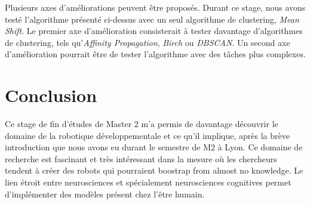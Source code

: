 \documentclass{llncs}
\begin{document}
Plusieurs axes d'améliorations peuvent être proposés. Durant ce stage, nous avons testé l'algorithme présenté ci-dessus avec un seul algorithme de clustering, \textit{Mean Shift}. Le premier axe d'amélioration consisterait à tester davantage d'algorithmes de clustering, tels qu'\textit{Affinity Propagation}, \textit{Birch} ou \textit{DBSCAN}. Un second axe d'amélioration pourrait être de tester l'algorithme avec des tâches plus complexes.

\section{Conclusion}

Ce stage de fin d'études de Master 2 m'a permis de davantage découvrir le domaine de la robotique développementale et ce qu'il implique, après la brève introduction que nous avons eu durant le semestre de M2 à Lyon. Ce domaine de recherche est fascinant et très intéressant dans la mesure où les chercheurs tendent à créer des robots qui pourraient boostrap from almost no knowledge. Le lien étroit entre neurosciences et spécialement neurosciences cognitives permet d'implémenter des modèles présent chez l'être humain.

%
%



\end{document}
